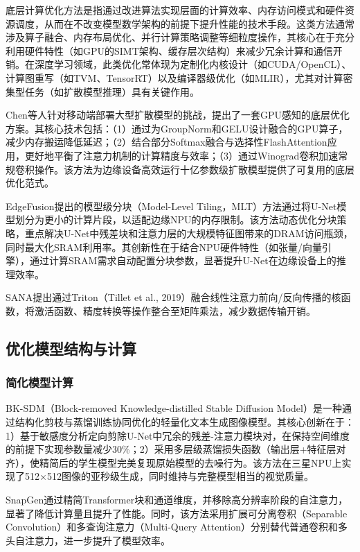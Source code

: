 \documentclass[11pt,a4paper,UTF8]{ctexart}
\begin{document}
底层计算优化方法是指通过改进算法实现层面的计算效率、内存访问模式和硬件资源调度，从而在不改变模型数学架构的前提下提升性能的技术手段。这类方法通常涉及算子融合、内存布局优化、并行计算策略调整等细粒度操作，其核心在于充分利用硬件特性（如GPU的SIMT架构、缓存层次结构）来减少冗余计算和通信开销。在深度学习领域，此类优化常体现为定制化内核设计（如CUDA/OpenCL）、计算图重写（如TVM\cite{TVM}、TensorRT）以及编译器级优化（如MLIR\cite{mlir}），尤其对计算密集型任务（如扩散模型推理）具有关键作用。

Chen等人\cite{chen2023speed}针对移动端部署大型扩散模型的挑战，提出了一套GPU感知的底层优化方案。其核心技术包括：（1）通过为GroupNorm和GELU设计融合的GPU算子，减少内存搬运降低延迟；（2）结合部分Softmax融合与选择性FlashAttention\cite{dao2022flashattention}应用，更好地平衡了注意力机制的计算精度与效率；（3）通过Winograd卷积加速常规卷积操作。该方法为边缘设备高效运行十亿参数级扩散模型提供了可复用的底层优化范式。

EdgeFusion提出的模型级分块（Model-Level Tiling，MLT）方法通过将U-Net模型划分为更小的计算片段，以适配边缘NPU的内存限制。该方法动态优化分块策略，重点解决U-Net中残差块和注意力层的大规模特征图带来的DRAM访问瓶颈，同时最大化SRAM利用率。其创新性在于结合NPU硬件特性（如张量/向量引擎），通过计算SRAM需求自动配置分块参数，显著提升U-Net在边缘设备上的推理效率。

SANA提出通过Triton（Tillet et al., 2019）融合线性注意力前向/反向传播的核函数，将激活函数、精度转换等操作整合至矩阵乘法，减少数据传输开销。


\iffalse
\newpage

\subsection{优化模型结构与计算}

\subsubsection{简化模型计算}

BK-SDM（Block-removed Knowledge-distilled Stable Diffusion Model）是一种通过结构化剪枝与蒸馏训练协同优化的轻量化文本生成图像模型。其核心创新在于：1）基于敏感度分析定向剪除U-Net中冗余的残差-注意力模块对，在保持空间维度的前提下实现参数量减少30\%；2）采用多层级蒸馏损失函数（输出层+特征层对齐），使精简后的学生模型完美复现原始模型的去噪行为。该方法在三星NPU上实现了512×512图像的亚秒级生成，同时维持与完整模型相当的视觉质量。

SnapGen\cite{hu2024snapgen}通过精简Transformer块和通道维度，并移除高分辨率阶段的自注意力，显著了降低计算量且提升了性能。同时，该方法采用扩展可分离卷积（Separable Convolution）\cite{howard2017mobilenets}和多查询注意力（Multi-Query Attention）\cite{shazeer2019fast}分别替代普通卷积和多头自注意力，进一步提升了模型效率。
\end{document}

